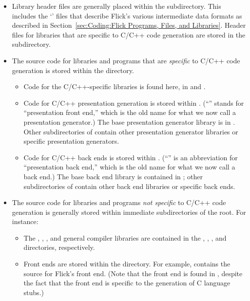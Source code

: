 \begin{itemize}
  \item Library header files are generally placed within the 
  subdirectory.  This includes the `' files that describe Flick's
  various intermediate data formats as described in
  Section~\ref{sec:Coding:Flick Programs, Files, and Libraries}.  Header files
  for libraries that are specific to C/C++ code generation are stored in the
   subdirectory.

  \item The source code for libraries and programs that are \emph{specific} to
  C/C++ code generation is stored within the  directory.
  \begin{itemize}
    \item Code for the C/C++-specific libraries is found here, in
     and .

    \item Code for C/C++ presentation generation is stored within
    .  (``'' stands for ``presentation front
    end,'' which is the old name for what we now call a presentation
    generator.)  The base presentation generator library is in
    .  Other subdirectories of  contain
    other presentation generator libraries or specific presentation generators.

    \item Code for C/C++ back ends is stored within .
    (``'' is an abbreviation for ``presentation back end,'' which
    is the old name for what we now call a back end.)  The base back end
    library is contained in ; other subdirectories of
     contain other back end libraries or specific back ends.
  \end{itemize}

  \item The source code for libraries and programs \emph{not specific} to C/C++
  code generation is generally stored within immediate subdirectories of the
  root.  For instance:
  \begin{itemize}
    \item The \AOI{}, \META{}, \MINT{}, and general compiler libraries are
    contained in the , , ,
    and  directories, respectively.

    \item Front ends are stored within the  directory.  For
    example,  contains the source for Flick's \CORBA{}
    front end.  (Note that the \MIG{} front end is found in ,
    despite the fact that the \MIG{} front end is specific to the generation of
    C language stubs.)
  \end{itemize}
\end{itemize}

